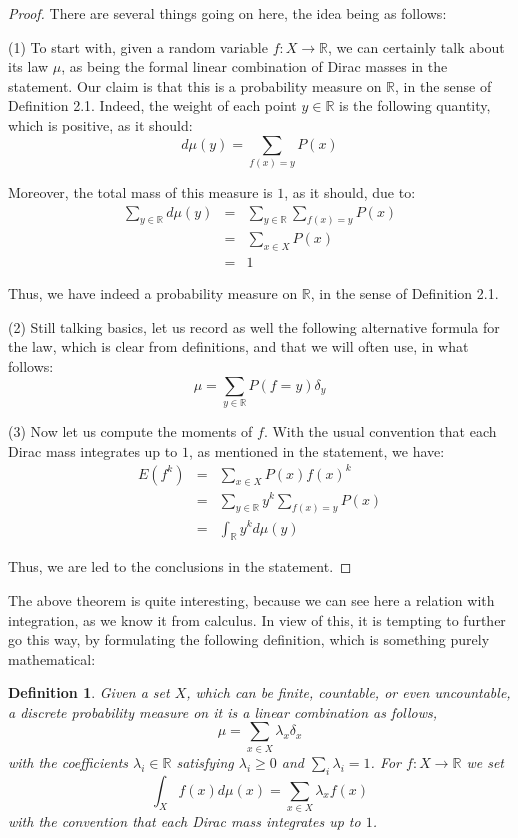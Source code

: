 \documentclass[12pt]{amsbook}
\newtheorem{definition}[theorem]{Definition}
\begin{document}
\begin{proof}
There are several things going on here, the idea being as follows:

\medskip

(1) To start with, given a random variable $f:X\to\mathbb R$, we can certainly talk about its law $\mu$, as being the formal linear combination of Dirac masses in the statement. Our claim is that this is a probability measure on $\mathbb R$, in the sense of Definition 2.1. Indeed, the weight of each point $y\in\mathbb R$ is the following quantity, which is positive, as it should:
$$d\mu(y)=\sum_{f(x)=y}P(x)$$

Moreover, the total mass of this measure is $1$, as it should, due to:
\begin{eqnarray*}
\sum_{y\in\mathbb R}d\mu(y)
&=&\sum_{y\in\mathbb R}\sum_{f(x)=y}P(x)\\
&=&\sum_{x\in X}P(x)\\
&=&1
\end{eqnarray*}

Thus, we have indeed a probability measure on $\mathbb R$, in the sense of Definition 2.1.

\medskip

(2) Still talking basics, let us record as well the following alternative formula for the law, which is clear from definitions, and that we will often use, in what follows:
$$\mu=\sum_{y\in\mathbb R}P(f=y)\delta_y$$

(3) Now let us compute the moments of $f$. With the usual convention that each Dirac mass integrates up to $1$, as mentioned in the statement, we have:
\begin{eqnarray*}
E(f^k)
&=&\sum_{x\in X}P(x)f(x)^k\\
&=&\sum_{y\in\mathbb R}y^k\sum_{f(x)=y}P(x)\\
&=&\int_\mathbb Ry^kd\mu(y)
\end{eqnarray*}

Thus, we are led to the conclusions in the statement.
\end{proof}

The above theorem is quite interesting, because we can see here a relation with integration, as we know it from calculus. In view of this, it is tempting to further go this way, by formulating the following definition, which is something purely mathematical:

\begin{definition}
Given a set $X$, which can be finite, countable, or even uncountable, a discrete probability measure on it is a linear combination as follows,
$$\mu=\sum_{x\in X}\lambda_x\delta_x$$
with the coefficients $\lambda_i\in\mathbb R$ satisfying $\lambda_i\geq0$ and $\sum_i\lambda_i=1$. For $f:X\to\mathbb R$ we set
$$\int_Xf(x)d\mu(x)=\sum_{x\in X}\lambda_xf(x)$$
with the convention that each Dirac mass integrates up to $1$.
\end{definition}
\end{document}
